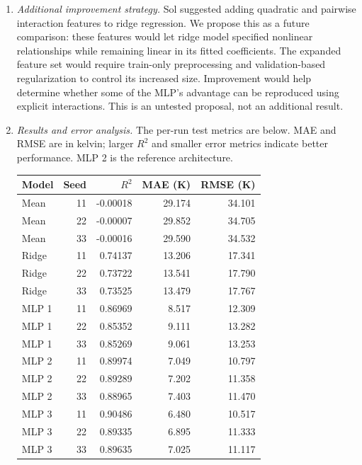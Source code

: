 \documentclass[12pt]{article}
\begin{document}
\begin{enumerate}
\begin{enumerate}[label=\textbf{\Alph*.}, leftmargin=*]
       \item \emph{Additional improvement strategy.}
       Sol suggested adding quadratic and pairwise interaction features
       to ridge regression. We propose this as a future comparison:
       these features would let ridge model specified nonlinear
       relationships while remaining linear in its fitted coefficients.
       The expanded feature set would require train-only preprocessing
       and validation-based regularization to control its increased
       size. Improvement would help determine whether some of the MLP's
       advantage can be reproduced using explicit interactions.
       This is an untested proposal, not an additional result.
       \item \emph{Results and error analysis.}
       The per-run test metrics are below. MAE and RMSE are in kelvin;
       larger $R^2$ and smaller error metrics indicate better performance.
       MLP 2 is the reference architecture.
       \begin{center}
       {\small
       \begin{tabular}{l r r r r}
           \toprule
           Model & Seed & $R^2$ & MAE (K) & RMSE (K) \\
           \midrule
           Mean & 11 & -0.00018 & 29.174 & 34.101 \\
           Mean & 22 & -0.00007 & 29.852 & 34.705 \\
           Mean & 33 & -0.00016 & 29.590 & 34.532 \\
           Ridge & 11 & 0.74137 & 13.206 & 17.341 \\
           Ridge & 22 & 0.73722 & 13.541 & 17.790 \\
           Ridge & 33 & 0.73525 & 13.479 & 17.767 \\
           MLP 1 & 11 & 0.86969 & 8.517 & 12.309 \\
           MLP 1 & 22 & 0.85352 & 9.111 & 13.282 \\
           MLP 1 & 33 & 0.85269 & 9.061 & 13.253 \\
           MLP 2 & 11 & 0.89974 & 7.049 & 10.797 \\
           MLP 2 & 22 & 0.89289 & 7.202 & 11.358 \\
           MLP 2 & 33 & 0.88965 & 7.403 & 11.470 \\
           MLP 3 & 11 & 0.90486 & 6.480 & 10.517 \\
           MLP 3 & 22 & 0.89335 & 6.895 & 11.333 \\
           MLP 3 & 33 & 0.89635 & 7.025 & 11.117 \\

\end{tabular}}
\end{center}
\end{enumerate}
\end{enumerate}
\end{document}
